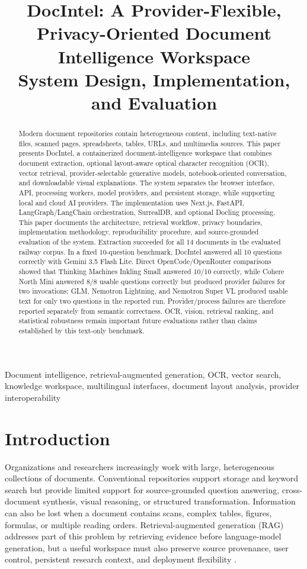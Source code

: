 \documentclass[conference]{IEEEtran}
\title{DocIntel: A Provider-Flexible, Privacy-Oriented Document Intelligence Workspace\\
\large System Design, Implementation, and Evaluation}
\author{
\IEEEauthorblockN{Samar Mittal\hspace{1.5em}Rajkumar Santra\hspace{1.5em}Sonam Maurya}
}
\begin{document}
\maketitle
\vspace{-0.75em}

\begin{abstract}
Modern document repositories contain heterogeneous content, including text-native files, scanned pages, spreadsheets, tables, URLs, and multimedia sources. This paper presents DocIntel, a containerized document-intelligence workspace that combines document extraction, optional layout-aware optical character recognition (OCR), vector retrieval, provider-selectable generative models, notebook-oriented conversation, and downloadable visual explanations. The system separates the browser interface, API, processing workers, model providers, and persistent storage, while supporting local and cloud AI providers. The implementation uses Next.js, FastAPI, LangGraph/LangChain orchestration, SurrealDB, and optional Docling processing. This paper documents the architecture, retrieval workflow, privacy boundaries, implementation methodology, reproducibility procedure, and source-grounded evaluation of the system. Extraction succeeded for all 14 documents in the evaluated railway corpus. In a fixed 10-question benchmark, DocIntel answered all 10 questions correctly with Gemini 3.5 Flash Lite. Direct OpenCode/OpenRouter comparisons showed that Thinking Machines Inkling Small answered 10/10 correctly, while Cohere North Mini answered 8/8 usable questions correctly but produced provider failures for two invocations; GLM, Nemotron Lightning, and Nemotron Super VL produced usable text for only two questions in the reported run. Provider/process failures are therefore reported separately from semantic correctness. OCR, vision, retrieval ranking, and statistical robustness remain important future evaluations rather than claims established by this text-only benchmark.
\end{abstract}

\begin{IEEEkeywords}
Document intelligence, retrieval-augmented generation, OCR, vector search, knowledge workspace, multilingual interfaces, document layout analysis, provider interoperability
\end{IEEEkeywords}

\section{Introduction}
Organizations and researchers increasingly work with large, heterogeneous collections of documents. Conventional repositories support storage and keyword search but provide limited support for source-grounded question answering, cross-document synthesis, visual reasoning, or structured transformation. Information can also be lost when a document contains scans, complex tables, figures, formulas, or multiple reading orders. Retrieval-augmented generation (RAG) addresses part of this problem by retrieving evidence before language-model generation, but a useful workspace must also preserve source provenance, user control, persistent research context, and deployment flexibility \cite{ragSurvey2024}.
\end{document}
